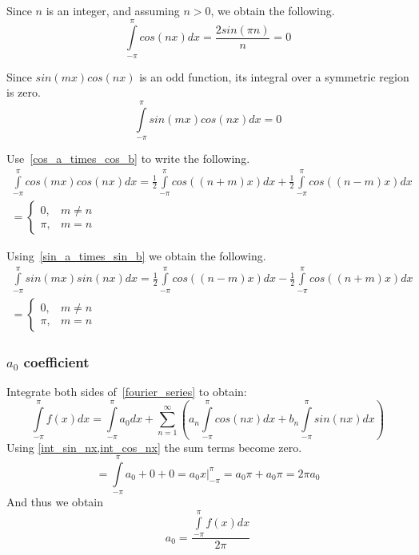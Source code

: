 \documentclass[a4paper]{article}
\numberwithin{equation}{subsection}
\begin{document}
Since $n$ is an integer, and assuming $n>0$, we obtain the following.
\begin{equation}\label{int_cos_nx}
\int \limits_{-\pi}^{\pi} cos(n x) dx = \frac{2 sin(\pi n)}{n}=0
\end{equation}

Since $sin(m x) cos(n x)$ is an odd function, its integral  over a symmetric region is zero.
\begin{equation}\label{int_sin_mx_cos_nx}
\int \limits_{-\pi}^{\pi} sin(m x) cos(n x) dx = 0
\end{equation}

Use~\cref{cos_a_times_cos_b} to write the following.
\begin{multline}\label{int_cos_mx_cos_nx}
\int \limits_{-\pi}^{\pi} cos(m x) cos(n x) dx = 
\frac{1}{2} \int \limits_{-\pi}^{\pi} cos((n+m) x) dx + \frac{1}{2} \int \limits_{-\pi}^{\pi}
cos((n-m) x) dx \\
=\begin{cases} 0, & m \neq n \\ \pi, &m=n \end{cases}
\end{multline}

Using~\cref{sin_a_times_sin_b} we obtain the following.
\begin{multline}\label{int_sin_mx_sin_nx}
\int \limits_{-\pi}^{\pi} sin(m x) sin(n x) dx
=\frac{1}{2} \int \limits_{-\pi}^{\pi} cos((n-m) x) dx - \frac{1}{2} \int \limits_{-\pi}^{\pi}
cos((n+m) x) dx \\
=\begin{cases} 0, & m \neq n \\ \pi, &m=n \end{cases}
\end{multline}


\subsubsection{$a_0$ coefficient}\label{a0_coefficient}
Integrate both sides of~\cref{fourier_series} to obtain:
$$\int \limits_{-\pi}^{\pi} f(x) dx = \int \limits_{-\pi}^{\pi} a_0 dx + \sum \limits_{n=1}^{\infty} (a_n \int \limits_{-\pi}^{\pi} cos(n x) dx + b_n \int \limits_{-\pi}^{\pi} sin(n x) dx)$$
Using \cref{int_sin_nx,int_cos_nx} the sum terms become zero.
$$=\int \limits_{-\pi}^{\pi} a_0 +0+0=a_0 x|_{-\pi}^{\pi}=a_0 \pi + a_0 \pi = 2\pi a_0$$
And thus we obtain
\begin{equation}\label{a0}
a_0 = \frac{\int \limits_{-\pi}^{\pi} f(x) dx}{2\pi}
\end{equation}
\end{document}
